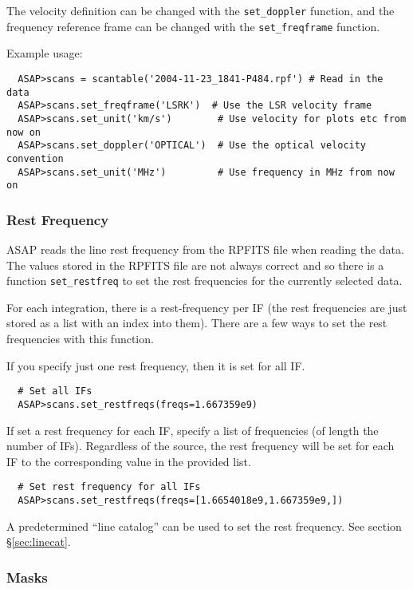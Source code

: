 \documentclass[11pt]{article}
\newcommand{\cmd}[1]{{\tt #1}}
\begin{document}
The velocity definition can be changed with the \cmd{set\_doppler}
function, and the frequency reference frame can be changed with the
\cmd{set\_freqframe} function.

Example usage:

\begin{verbatim}
  ASAP>scans = scantable('2004-11-23_1841-P484.rpf') # Read in the data
  ASAP>scans.set_freqframe('LSRK')  # Use the LSR velocity frame
  ASAP>scans.set_unit('km/s')        # Use velocity for plots etc from now on
  ASAP>scans.set_doppler('OPTICAL')  # Use the optical velocity convention
  ASAP>scans.set_unit('MHz')         # Use frequency in MHz from now on
\end{verbatim}


\subsubsection{Rest Frequency}

ASAP reads the line rest frequency
from the RPFITS file when reading the data. The values stored in the
RPFITS file are not always correct and so there is a function
\cmd{set\_restfreq} to set the rest frequencies for the currently
selected data.

For each integration, there is a rest-frequency per IF (the rest
frequencies are just stored as a list with an index into them).
There are a few ways to set the rest frequencies with this function.

If you specify just one rest frequency, then it is set for all IF.

\begin{verbatim}
  # Set all IFs
  ASAP>scans.set_restfreqs(freqs=1.667359e9)
\end{verbatim}

If set a rest frequency for each IF, specify a list of frequencies (of
length the number of IFs).  Regardless of the source, the rest
frequency will be set for each IF to the corresponding value in the
provided list.

\begin{verbatim}
  # Set rest frequency for all IFs
  ASAP>scans.set_restfreqs(freqs=[1.6654018e9,1.667359e9,])

\end{verbatim}

A predetermined ``line catalog'' can be used to set the rest
frequency. See section \S \ref{sec:linecat}.


\subsubsection{Masks}
\end{document}
